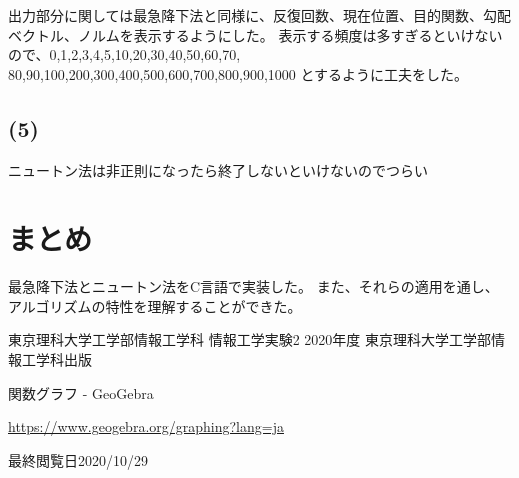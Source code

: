 \documentclass[12pt]{jarticle}
\begin{document}
出力部分に関しては最急降下法と同様に、反復回数、現在位置、目的関数、勾配ベクトル、ノルムを表示するようにした。
表示する頻度は多すぎるといけないので、0,1,2,3,4,5,10,20,30,40,50,60,70,
80,90,100,200,300,400,500,600,700,800,900,1000
とするように工夫をした。

\subsection*{(5)}
ニュートン法は非正則になったら終了しないといけないのでつらい

\section{まとめ}
最急降下法とニュートン法をC言語で実装した。
また、それらの適用を通し、
アルゴリズムの特性を理解することができた。

\clearpage

\begin{thebibliography}{99}
    \label{sannkoubunnkenn_chapter}
    東京理科大学工学部情報工学科 情報工学実験2 2020年度
    東京理科大学工学部情報工学科出版

    関数グラフ - GeoGebra

    \url{https://www.geogebra.org/graphing?lang=ja}

    最終閲覧日2020/10/29

\end{thebibliography}


\clearpage

\appendix
\end{document}
